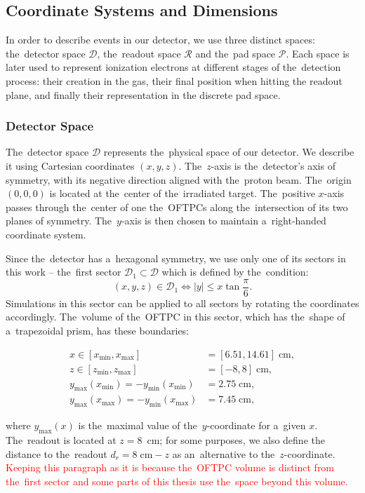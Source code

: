 		\subsection{Coordinate Systems and Dimensions}
		\label{sec:coor}
			In order to describe events in our detector, we use three distinct spaces: the~detector space $\mathcal{D}$, the~readout space $\mathcal{R}$ and the~pad space $\mathcal{P}$. Each space is later used to represent ionization electrons at different stages of the~detection process: their creation in the gas, their final position when hitting the readout plane, and finally their representation in the discrete pad space.
		
			\subsubsection{Detector Space}
				The~detector space $\mathcal{D}$ represents the~physical space of our detector. We describe it using Cartesian coordinates $(x,y,z)$. The~$z$-axis is the~detector's axis of symmetry, with its negative direction aligned with the~proton beam. The~origin $(0,0,0)$ is located at the~center of the~irradiated target. The~positive $x$\nobreakdash-axis passes through the~center of one the~\ac{OFTPC}s along the~intersection of its two planes of symmetry. The~$y$\nobreakdash-axis is then chosen to maintain a~right-handed coordinate system.
				
				Since the~detector has a~hexagonal symmetry, we use only one of its sectors in this work -- the~first sector $\mathcal{D}_1 \subset \mathcal{D}$ which is defined by the~condition:
					\begin{equation}
						(x,y,z) \in \mathcal{D}_1 \Leftrightarrow |y| \leq x\tan \frac{\pi}{6}.
					\end{equation}
				Simulations in this sector can be applied to all sectors by rotating the coordinates accordingly. The~volume of the~\ac{OFTPC} in this sector, which has the~shape of a~trapezoidal prism, has these boundaries:
					\begin{linenomath}
						\begin{align}
							x \in [x_\text{min},x_\text{max}] &= [6.51, 14.61] \;\text{cm},\\
							z \in [z_\text{min},z_\text{max}] &= [-8,8] \;\text{cm},\\
							y_\text{max}(x_\text{min}) = -y_\text{min}(x_\text{min}) &=  2.75\;\text{cm},\\
							y_\text{max}(x_\text{max}) = -y_\text{min}(x_\text{max}) &=  7.45\;\text{cm},
						\end{align}
					\end{linenomath}
				where $y_\text{max}(x)$ is the~maximal value of the~$y$-coordinate for a~given $x$. The~readout is located at $z = 8$~cm; for some purposes, we also define the distance to the~readout $d_r = 8\;\text{cm}-z$ as an~alternative to the~$z$-coordinate. \textcolor{red}{Keeping this paragraph as it is because the~\ac{OFTPC} volume is distinct from the~first sector and some parts of this thesis use the~space beyond this volume.}
				
